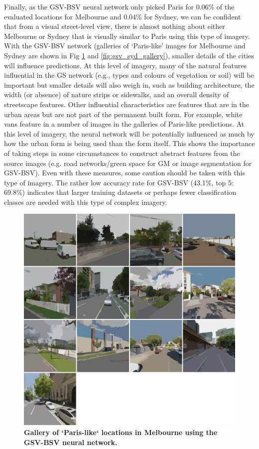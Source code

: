 \documentclass[Crown,sageh,times]{sagej}
\begin{document}
Finally, as the GSV-BSV neural network only picked Paris for 0.06\% of the evaluated locations for Melbourne and 0.04\% for Sydney, we can be confident that from a visual street-level view, there is almost nothing about either Melbourne or Sydney that is visually similar to Paris using this type of imagery. With the GSV-BSV network (galleries of `Paris-like' images for Melbourne and Sydney are shown in Fig \ref{fig:gsv_mel_gallery} and \ref{fig:gsv_syd_gallery}), smaller details of the cities will influence predictions. At this level of imagery, many of the natural features influential in the GS network (e.g., types and colours of vegetation or soil) will be important but smaller details will also weigh in, such as building architecture, the width (or absence) of nature strips or sidewalks, and an overall density of streetscape features. Other influential characteristics are features that are in the urban areas but are not part of the permanent built form. For example, white vans feature in a number of images in the galleries of Paris-like predictions. At this level of imagery, the neural network will be potentially influenced as much by how the urban form is being used than the form itself. This shows the importance of taking steps in some circumstances to construct abstract features from the source images (e.g. road networks/green space for GM or image segmentation for GSV-BSV). Even with these measures, some caution should be taken with this type of imagery. The rather low accuracy rate for GSV-BSV (43.1\%, top 5: 69.8\%) indicates that larger training datasets or perhaps fewer classification classes are needed with this type of complex imagery.


\begin{figure}[!htbp]
\centering    
\includegraphics[scale=0.35]{Images/PlosOne/Fig12.png}  
\caption{\bf Gallery of `Paris-like` locations in Melbourne using the GSV-BSV neural network.}    
 \label{fig:gsv_mel_gallery}  
\end{figure} 
\end{document}
